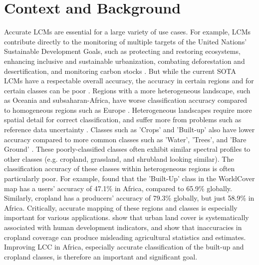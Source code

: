 \documentclass[a4paper,12pt]{article}
\begin{document}
\section{Context and Background}
Accurate \acp{LCM} are essential for a large variety of use cases. For example, \acp{LCM} contribute directly to the monitoring of multiple targets of the United Nations' Sustainable Development Goals, such as protecting and restoring ecosystems, enhancing inclusive and sustainable urbanization, combating deforestation and desertification, and monitoring carbon stocks \citep{moraMonitoringProgressSustainable2016}. But while the current \ac{SOTA} \acp{LCM} have a respectable overall accuracy, the accuracy in certain regions and for certain classes can be poor \citep{xuComparativeValidationRecent2024,zhaoAssessingAccuracyConsistency2023}. Regions with a more heterogeneous landscape, such as Oceania and subsaharan-Africa, have worse classification accuracy compared to homogeneous regions such as Europe \citep{zhaoAssessingAccuracyConsistency2023}. Heterogeneous landscapes require more spatial detail for correct classification, and suffer more from problems such as reference data uncertainty \citep{xuComparativeValidationRecent2024}. Classes such as 'Crops' and 'Built-up' also have lower accuracy compared to more common classes such as 'Water', 'Trees', and 'Bare Ground' \citep{xuComparativeValidationRecent2024}. These poorly-classified classes often exhibit similar spectral profiles to other classes (e.g. cropland, grassland, and shrubland looking similar).  The classification accuracy of these classes within heterogeneous regions is often particularly poor. For example, \citet{tsendbazarProductValidationReport2022} found that the 'Built-Up' class in the WorldCover map \citep{zanagaESAWorldCover102022} has a users' accuracy of 47.1\% in Africa, compared to 65.9\% globally. Similarly, cropland has a producers' accuracy of 79.3\% globally, but just 58.9\% in Africa. Critically, accurate mapping of these regions and classes is especially important for various applications. \citet{bettencourtInfrastructureDeficitsInformal2025} show that urban land cover is systematically associated with human development indicators, and \citet{kernerHowAccurateAre2024a} show that inaccuracies in cropland coverage can produce misleading agricultural statistics and estimates. Improving \ac{LCC} in Africa, especially accurate classification of the built-up and cropland classes, is therefore an important and significant goal.
\end{document}
